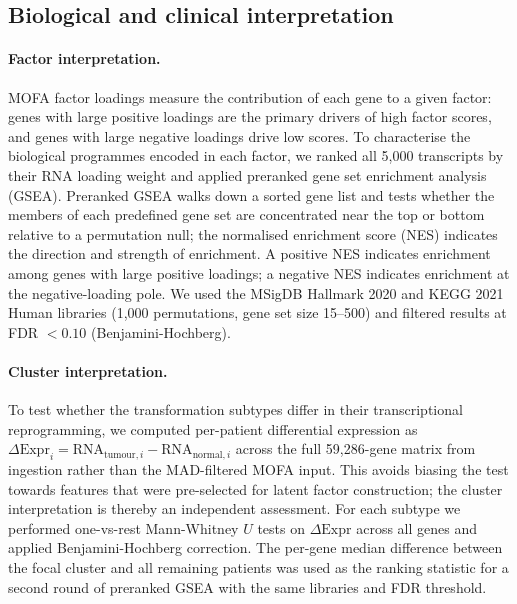 \subsection{Biological and clinical interpretation}

\paragraph{Factor interpretation.}
MOFA factor loadings measure the contribution of each gene to a given factor: genes
with large positive loadings are the primary drivers of high factor scores, and genes
with large negative loadings drive low scores.
To characterise the biological programmes encoded in each factor, we ranked all 5,000
transcripts by their RNA loading weight and applied preranked gene set enrichment
analysis (GSEA).
Preranked GSEA walks down a sorted gene list and tests whether the members of each
predefined gene set are concentrated near the top or bottom relative to a permutation
null; the normalised enrichment score (NES) indicates the direction and strength of
enrichment.
A positive NES indicates enrichment among genes with large positive loadings; a
negative NES indicates enrichment at the negative-loading pole.
We used the MSigDB Hallmark 2020 and KEGG 2021 Human libraries (1,000 permutations,
gene set size 15--500) and filtered results at FDR $< 0.10$ (Benjamini-Hochberg).

\paragraph{Cluster interpretation.}
To test whether the transformation subtypes differ in their transcriptional
reprogramming, we computed per-patient differential expression as
$\Delta \text{Expr}_i = \text{RNA}_{\text{tumour},i} - \text{RNA}_{\text{normal},i}$
across the full 59,286-gene matrix from ingestion rather than the MAD-filtered
MOFA input.
This avoids biasing the test towards features that were pre-selected for latent
factor construction; the cluster interpretation is thereby an independent assessment.
For each subtype we performed one-vs-rest Mann-Whitney $U$ tests on
$\Delta \text{Expr}$ across all genes and applied Benjamini-Hochberg correction.
The per-gene median difference between the focal cluster and all remaining patients
was used as the ranking statistic for a second round of preranked GSEA with the
same libraries and FDR threshold.


